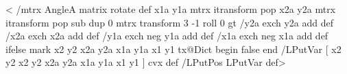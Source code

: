 \def\pscirclebox@ii#1{%
  \begingroup
    \pst@useboxpar
    \setbox\pst@hbox=\hbox{#1\pscirclebox@iii\box\pst@hbox}%
    \ifpsboxsep
      \pst@dima=.5\wd\pst@hbox
      \pst@dimb=\ht\pst@hbox
      \advance\pst@dimb\dp\pst@hbox
      \divide\pst@dimb 2
      \pst@pyth\pst@dima\pst@dimb\pst@dimc
      \advance\pst@dimc\pslinewidth
      \advance\pst@dimc\psframesep
      \advance\pst@dimb-\pst@dimc
      \setbox\pst@hbox=\hbox to2\pst@dimc{%
        \hss
        \vbox{\kern-\pst@dimb\box\pst@hbox}%
        \hss}%
      \advance\pst@dimb-\dp\pst@hbox
      \dp\pst@hbox=-\pst@dimb
    \fi
    \leavevmode\box\pst@hbox
  \endgroup}

<%
  \tx@GetPos
  \tx@GetArms
  /mtrx AngleA matrix rotate def
  x1a y1a mtrx itransform pop
  x2a y2a mtrx itransform pop sub
  dup 0 mtrx transform
  3 -1 roll 0 gt
  { /y2a exch y2a add def /x2a exch x2a add def }
  { /y1a exch neg y1a add def /x1a exch neg x1a add def }
  ifelse
  mark
  x2 y2 x2a y2a x1a y1a x1 y1
  tx@Dict begin false \tx@Line end
  /LPutVar [ x2 y2 x2 y2 x2a y2a x1a y1a x1 y1 ] cvx def
  /LPutPos { LPutVar \tx@AnglesMP } def>

\def\multips{\begingroup\pst@getrputrot\multips@i}
\def\multips@i(#1){\@ifnextchar({\@multips@ii(#1)}{\@multips@ii(0,0)(#1)}}
\def\@multips@ii(#1)(#2)#3#4{%
    \pst@getcoor{#1}\pst@tempa
    \pst@@getcoor{#2}%
    \pst@cnta=#3\relax
    \init@pscode
    \addto@pscode{%
      \pst@tempa T \the\pst@cnta\space \pslbrace
      gsave \ifx\pst@rot\@empty\else\pst@rot rotate \fi }%
    \hbox to\z@{%
      \def\init@pscode{%
        \addto@pscode{%
          gsave
          \pst@number\pslinewidth SLW
          \pst@usecolor\pslinecolor}}%
      \def\use@pscode{\addto@pscode{grestore}}%
      \def\psclip##1{\pst@misplaced\psclip}%
      \def\nc@object##1##2##3##4{\pst@misplaced{node connection}}%
      #4}%
    \addto@pscode{grestore \pst@coor T \psrbrace repeat}%
    \leavevmode
    \use@pscode
  \endgroup
  \ignorespaces}

